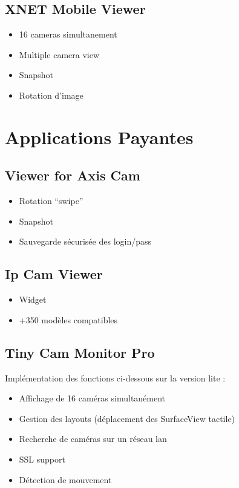 \documentclass[a4paper,10pt]{report}
\begin{document}
\section{XNET Mobile Viewer}
\begin{itemize}
  \item 16 cameras simultanement
  \item Multiple camera view
  \item Snapshot
  \item Rotation d'image
\end{itemize}

\chapter{Applications Payantes}
\section{Viewer for Axis Cam}
\begin{itemize}
  \item Rotation ``swipe''
  \item Snapshot
  \item Sauvegarde sécurisée des login/pass
\end{itemize}

\section{Ip Cam Viewer}
\begin{itemize}
  \item Widget
  \item +350 modèles compatibles
\end{itemize}

\section{Tiny Cam Monitor Pro}
Implémentation des fonctions ci-dessous sur la version lite :
\begin{itemize}
  \item Affichage de 16 caméras simultanément
  \item Gestion des layouts (déplacement des SurfaceView tactile)
  \item Recherche de caméras sur un réseau lan
  \item SSL support
  \item Détection de mouvement
\end{itemize}
\end{document}
